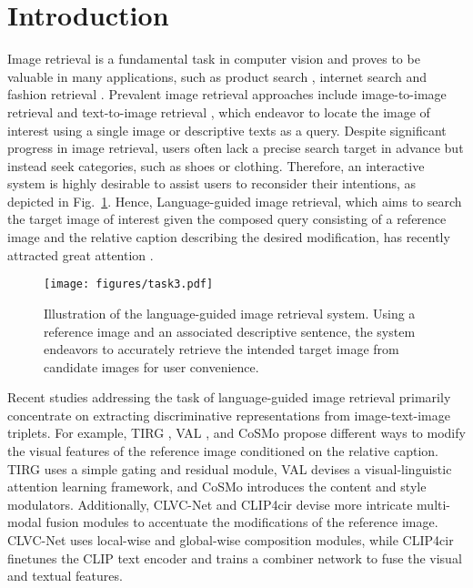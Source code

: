 \documentclass[sigconf]{acmart}
\begin{document}
\section{Introduction}
\label{sec:intro}
Image retrieval is a fundamental task in computer vision and proves to be valuable in many applications, such as product search \cite{guo2019attentive,sharma2019retrieving,guo2018multi}, internet search \cite{noh2017large} and fashion retrieval \cite{liu2016deepfashion,liao2018interpretable}. Prevalent image retrieval approaches include image-to-image retrieval \cite{wang2018cosface,deng2019arcface,fan2019spherereid,sheng2020mining,feng2020learning} and text-to-image retrieval \cite{ji2017cross,zhen2019deep,zheng2020dual,chun2021probabilistic,guerrero2021cross,wang2022point}, which endeavor to locate the image of interest using a single image or descriptive texts as a query. 
Despite significant progress in image retrieval, users often lack a precise search target in advance but instead seek categories, such as shoes or clothing. Therefore, an interactive system is highly desirable to assist users to reconsider their intentions, as depicted in Fig.~\ref{fig:task}. Hence, Language-guided image retrieval, which aims to search the target image of interest given the composed query consisting of a reference image and the relative caption describing the desired modification, has recently attracted great attention \cite{vo2019composing,chen2020image,lee2021cosmo,kim2021dual,wen2021comprehensive}.

\begin{figure}[t]
    \centering
    \texttt{[image: figures/task3.pdf]}
    \vspace{-.1in}
    \caption{Illustration of the language-guided image retrieval system. Using a reference image and an associated descriptive sentence, the system endeavors to accurately retrieve the intended target image from candidate images for user convenience.}
    \label{fig:task}
\end{figure}

Recent studies addressing the task of language-guided image retrieval primarily concentrate on extracting discriminative representations from image-text-image triplets. For example, TIRG \cite{vo2019composing}, VAL \cite{chen2020image}, and CoSMo \cite{lee2021cosmo} propose different ways to modify the visual features of the reference image conditioned on the relative caption. TIRG uses a simple gating and residual module, VAL devises a visual-linguistic attention learning framework, and CoSMo introduces the content and style modulators. Additionally, CLVC-Net \cite{wen2021comprehensive} and CLIP4cir \cite{baldrati2022conditioned} devise more intricate multi-modal fusion modules to accentuate the modifications of the reference image. CLVC-Net uses local-wise and global-wise composition modules, while CLIP4cir finetunes the CLIP \cite{radford2021learning} text encoder and trains a combiner network to fuse the visual and textual features.
\end{document}

